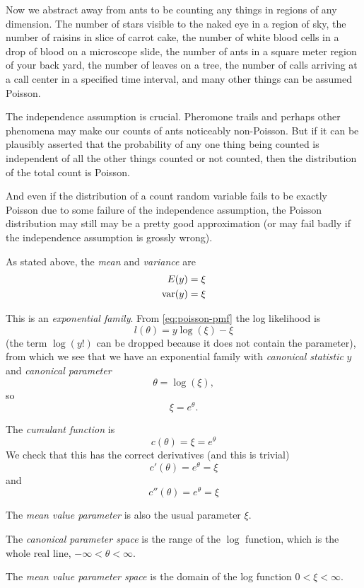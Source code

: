 Now we abstract away from ants to be counting any things in regions of
any dimension.  The number of stars visible to the naked eye in a region
of sky, the number of raisins in slice of carrot cake, the number of white
blood cells in a drop of blood on a microscope slide, the number of ants
in a square meter region of your back yard, the number of leaves on a tree,
the number of calls arriving at a call center in a specified time interval,
and many other things can be assumed Poisson.

The independence assumption is crucial.  Pheromone trails and perhaps other
phenomena may make our counts of ants noticeably non-Poisson.  But if it
can be plausibly asserted that the probability of any one thing being counted
is independent of all the other things counted or not counted, then the
distribution of the total count is Poisson.

And even if the distribution of a count random variable fails to be exactly
Poisson due to some failure of the independence assumption, the Poisson
distribution may still may be a pretty good approximation (or may fail badly
if the independence assumption is grossly wrong).

As stated above, the \emph{mean} and \emph{variance} are
\begin{align*}
   E(y) & = \xi
   \\
   \operatorname{var}(y) & = \xi
\end{align*}

This is an \emph{exponential family}.  From \eqref{eq:poisson-pmf}
the log likelihood is
$$
   l(\theta) = y \log(\xi) - \xi
$$
(the term $\log(y !)$ can be dropped because it does not contain the
parameter), from which we see that we have an exponential family with
\emph{canonical statistic} $y$ and \emph{canonical parameter}
$$
   \theta = \log(\xi),
$$
so
$$
   \xi = e^{\theta}.
$$

The \emph{cumulant function} is
$$
   c(\theta) = \xi = e^\theta
$$
We check that this has the correct derivatives (and this is trivial)
$$
   c'(\theta) = e^\theta = \xi
$$
and
$$
   c''(\theta) = e^\theta = \xi
$$

The \emph{mean value parameter} is also the usual parameter $\xi$.

The \emph{canonical parameter space} is the range of the $\log$ function,
which is the whole real line, $- \infty < \theta < \infty$.

\begin{sloppypar}
The \emph{mean value parameter space} is the domain of the log function
\mbox{$0 < \xi < \infty$}.
\end{sloppypar}

